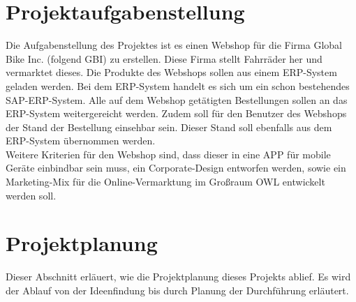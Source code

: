 \newpage
\section{Projektaufgabenstellung}
Die Aufgabenstellung des Projektes ist es einen Webshop für die Firma Global Bike Inc. (folgend GBI) zu erstellen. Diese Firma stellt Fahrräder her und vermarktet dieses. Die Produkte des Webshops sollen aus einem ERP-System geladen werden. Bei dem ERP-System handelt es sich um ein schon bestehendes SAP-ERP-System. Alle auf dem Webshop getätigten Bestellungen sollen an das ERP-System weitergereicht werden. Zudem soll für den Benutzer des Webshops der Stand der Bestellung einsehbar sein. Dieser Stand soll ebenfalls aus dem ERP-System übernommen werden. \\
Weitere Kriterien für den Webshop sind, dass dieser in eine APP für mobile Geräte einbindbar sein muss, ein Corporate-Design entworfen werden, sowie ein Marketing-Mix für die Online-Vermarktung im Großraum OWL entwickelt werden soll.

\section{Projektplanung}
Dieser Abschnitt erläuert, wie die Projektplanung dieses Projekts ablief. Es wird der Ablauf von der Ideenfindung bis durch Planung der Durchführung erläutert.

